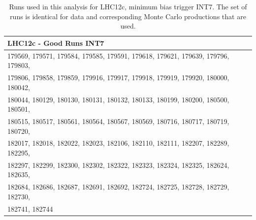 \begin{table}[h!]
	\hspace*{-0.2cm}
	\small
	\centering
	\begin{tabular}{ll}  
	    \toprule
	    \textbf{LHC12c - Good Runs INT7} \\ \midrule
		179569, 179571, 179584, 179585, 179591, 179618, 179621, 179639, 179796, 179803,  \\ \midrule
		179806, 179858, 179859, 179916, 179917, 179918, 179919, 179920, 180000, 180042,  \\ \midrule
		180044, 180129, 180130, 180131, 180132, 180133, 180199, 180200, 180500, 180501,  \\ \midrule 
		180515, 180517, 180561, 180564, 180567, 180569, 180716, 180717, 180719, 180720,  \\ \midrule 
		182017, 182018, 182022, 182023, 182106, 182110, 182111, 182207, 182289, 182295,  \\ \midrule 
		182297, 182299, 182300, 182302, 182322, 182323, 182324, 182325, 182624, 182635,  \\ \midrule 
		182684, 182686, 182687, 182691, 182692, 182724, 182725, 182728, 182729, 182730,  \\ \midrule 
		182741, 182744 \\
		\bottomrule
	\end{tabular}
	\caption{Runs used in this analysis for LHC12c, minimum bias trigger INT7. The set of runs is identical for data and corresponding Monte Carlo productions that are used.}
	\label{tab:runs12c}
\end{table}

